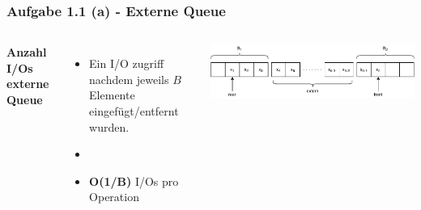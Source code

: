 \documentclass[aspectratio=169]{beamer}
\begin{document}
\begin{frame}
\frametitle{Aufgabe 1.1 (a) - Externe Queue}
\begin{columns}[c] %
	
	\textbf{Anzahl I/Os externe Queue}
	\begin{itemize}
		\item Ein I/O zugriff nachdem jeweils $B$ Elemente eingefügt/entfernt wurden.
		\item[]
		\item \textbf{O(1/B)} I/Os pro Operation
	\end{itemize}
	
	\includegraphics[scale=.5]{queue1.pdf}
	
\end{columns}
\end{frame}
\end{document}

